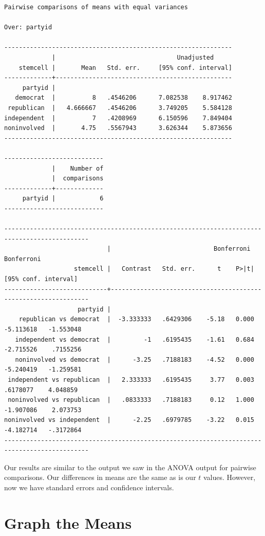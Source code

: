 \documentclass[
]{book}
\begin{document}
\begin{verbatim}
Pairwise comparisons of means with equal variances

Over: partyid

--------------------------------------------------------------
             |                                 Unadjusted
    stemcell |       Mean   Std. err.     [95% conf. interval]
-------------+------------------------------------------------
     partyid |
   democrat  |          8   .4546206      7.082538    8.917462
 republican  |   4.666667   .4546206      3.749205    5.584128
independent  |          7   .4208969      6.150596    7.849404
noninvolved  |       4.75   .5567943      3.626344    5.873656
--------------------------------------------------------------

---------------------------
             |    Number of
             |  comparisons
-------------+-------------
     partyid |            6
---------------------------

---------------------------------------------------------------------------------------------
                            |                            Bonferroni           Bonferroni
                   stemcell |   Contrast   Std. err.      t    P>|t|     [95% conf. interval]
----------------------------+----------------------------------------------------------------
                    partyid |
    republican vs democrat  |  -3.333333   .6429306    -5.18   0.000    -5.113618   -1.553048
   independent vs democrat  |         -1   .6195435    -1.61   0.684    -2.715526    .7155256
   noninvolved vs democrat  |      -3.25   .7188183    -4.52   0.000    -5.240419   -1.259581
 independent vs republican  |   2.333333   .6195435     3.77   0.003     .6178077    4.048859
 noninvolved vs republican  |   .0833333   .7188183     0.12   1.000    -1.907086    2.073753
noninvolved vs independent  |      -2.25   .6979785    -3.22   0.015    -4.182714   -.3172864
---------------------------------------------------------------------------------------------
\end{verbatim}

Our results are similar to the output we saw in the ANOVA output for pairwise comparisons. Our differences in means are the same as is our \(t\) values. However, now we have standard errors and confidence intervals.

\section{Graph the Means}\label{graph-the-means}
\end{document}
